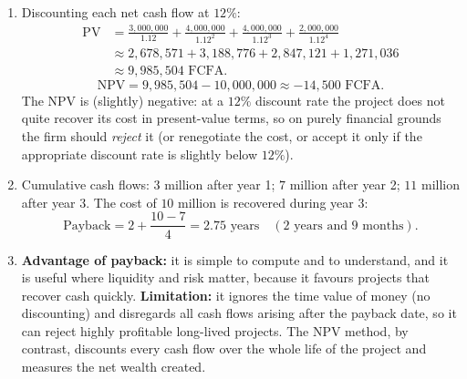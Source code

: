 \documentclass[11pt]{article}
\begin{document}
\begin{corrige}
\begin{enumerate}
\item Discounting each net cash flow at $12\%$:
\begin{align*}
\text{PV} &= \frac{3{,}000{,}000}{1.12} + \frac{4{,}000{,}000}{1.12^{2}} + \frac{4{,}000{,}000}{1.12^{3}} + \frac{2{,}000{,}000}{1.12^{4}} \\
&\approx 2{,}678{,}571 + 3{,}188{,}776 + 2{,}847{,}121 + 1{,}271{,}036 \\
&\approx 9{,}985{,}504 \text{ FCFA}.
\end{align*}
\[ \text{NPV} = 9{,}985{,}504 - 10{,}000{,}000 \approx -14{,}500 \text{ FCFA}. \]
The NPV is (slightly) negative: at a $12\%$ discount rate the project does not quite recover its cost in present-value terms, so on purely financial grounds the firm should \emph{reject} it (or renegotiate the cost, or accept it only if the appropriate discount rate is slightly below $12\%$).
\item Cumulative cash flows: $3$ million after year 1; $7$ million after year 2; $11$ million after year 3. The cost of $10$ million is recovered during year 3:
\[ \text{Payback} = 2 + \frac{10 - 7}{4} = 2.75 \text{ years} \quad (\text{2 years and 9 months}). \]
\item \textbf{Advantage of payback:} it is simple to compute and to understand, and it is useful where liquidity and risk matter, because it favours projects that recover cash quickly. \textbf{Limitation:} it ignores the time value of money (no discounting) and disregards all cash flows arising after the payback date, so it can reject highly profitable long-lived projects. The NPV method, by contrast, discounts every cash flow over the whole life of the project and measures the net wealth created.
\end{enumerate}
\end{corrige}
\end{document}
